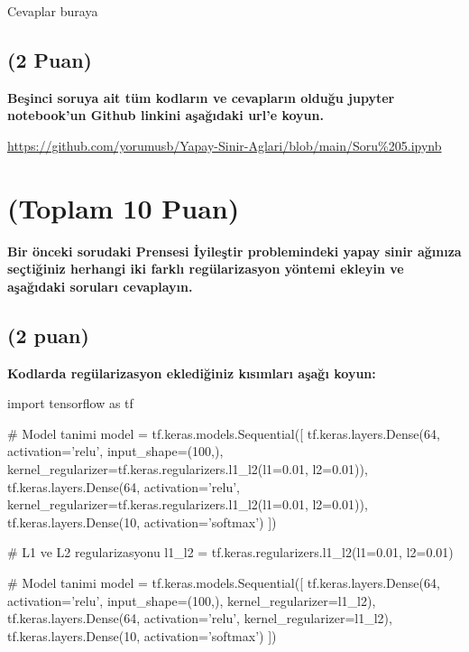 \documentclass[11pt]{article}
\begin{document}
Cevaplar buraya

\subsection{(2 Puan)} \textbf{Beşinci soruya ait tüm kodların ve cevapların olduğu jupyter notebook'un Github linkini aşağıdaki url'e koyun.}

\url{https://github.com/yorumusb/Yapay-Sinir-Aglari/blob/main/Soru%205.ipynb}

\section{(Toplam 10 Puan)} \textbf{Bir önceki sorudaki Prensesi İyileştir problemindeki yapay sinir ağınıza seçtiğiniz herhangi iki farklı regülarizasyon yöntemi ekleyin ve aşağıdaki soruları cevaplayın.} 

\subsection{(2 puan)} \textbf{Kodlarda regülarizasyon eklediğiniz kısımları aşağı koyun:} 

\begin{python}
import tensorflow as tf

# Model tanimi
model = tf.keras.models.Sequential([
  tf.keras.layers.Dense(64, activation='relu', input_shape=(100,), 
                        kernel_regularizer=tf.keras.regularizers.l1_l2(l1=0.01, l2=0.01)),
  tf.keras.layers.Dense(64, activation='relu', 
                        kernel_regularizer=tf.keras.regularizers.l1_l2(l1=0.01, l2=0.01)),
  tf.keras.layers.Dense(10, activation='softmax')
])

# L1 ve L2 regularizasyonu
l1_l2 = tf.keras.regularizers.l1_l2(l1=0.01, l2=0.01)

# Model tanimi
model = tf.keras.models.Sequential([
  tf.keras.layers.Dense(64, activation='relu', input_shape=(100,), kernel_regularizer=l1_l2),
  tf.keras.layers.Dense(64, activation='relu', kernel_regularizer=l1_l2),
  tf.keras.layers.Dense(10, activation='softmax')
])

\end{python}
\end{document}
